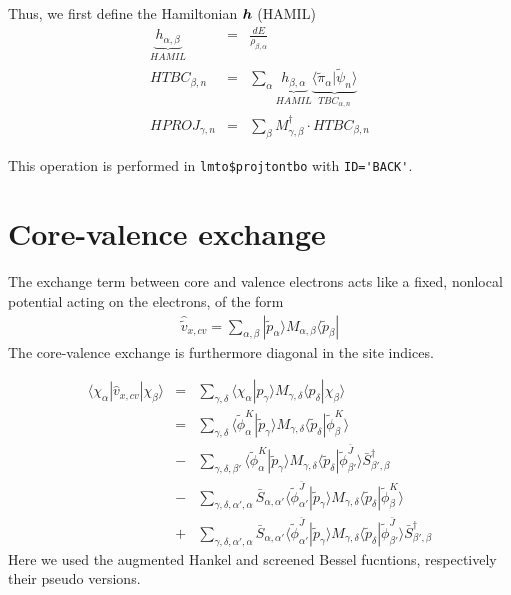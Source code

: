 \documentclass[11pt,a4paper]{report}
\begin{document}
Thus, we first define the Hamiltonian $\bm{h}$ (HAMIL) 
\begin{eqnarray}
\underbrace{h_{\alpha,\beta}}_{HAMIL}&=&\frac{dE}{\rho_{\beta,\alpha}}
\nonumber\\
HTBC_{\beta,n}&=&
\sum_\alpha \underbrace{h_{\beta,\alpha}}_{HAMIL}
\underbrace{\langle\tilde{\pi}_\alpha|\tilde{\psi}_n\rangle}_{TBC_{\alpha,n}}
\nonumber\\
HPROJ_{\gamma,n}&=&\sum_\beta M^\dagger_{\gamma,\beta}\cdot HTBC_{\beta,n}
\end{eqnarray}


This operation is performed in
\verb|lmto$projtontbo| with \verb|ID='BACK'|.




\section{Core-valence exchange}
The exchange term between core and valence electrons acts like a
fixed, nonlocal potential acting on the electrons, of the form
\begin{eqnarray}
\hat{\tilde{v}}_{x,cv}=\sum_{\alpha,\beta}|\tilde{p}_\alpha\rangle 
M_{\alpha,\beta}\langle\tilde{p}_\beta|
\end{eqnarray}
The core-valence exchange is furthermore diagonal in the site indices.

\begin{eqnarray}
\langle\chi_\alpha|\hat{v}_{x,cv}|\chi_\beta\rangle
&=&
\sum_{\gamma,\delta}
\langle\chi_\alpha|p_\gamma\rangle 
M_{\gamma,\delta}\langle p_\delta|\chi_\beta\rangle
\nonumber\\
&=&
\sum_{\gamma,\delta}
\langle\tilde{\phi}^{K}_\alpha|\tilde{p}_\gamma\rangle 
M_{\gamma,\delta}
\langle\tilde{p}_\delta|\tilde{\phi}^{K}_\beta\rangle
\nonumber\\
&-&
\sum_{\gamma,\delta,\beta'}
\langle\tilde{\phi}^{K}_\alpha|\tilde{p}_\gamma\rangle 
M_{\gamma,\delta}
\langle\tilde{p}_\delta|\tilde{\phi}^{\bar{J}}_{\beta'}\rangle 
\bar{S}^\dagger_{\beta',\beta}
\nonumber\\
&-&
\sum_{\gamma,\delta,\alpha',\alpha}
\bar{S}_{\alpha,\alpha'}
\langle\tilde{\phi}^{\bar{J}}_{\alpha'}|\tilde{p}_\gamma\rangle 
M_{\gamma,\delta}
\langle\tilde{p}_\delta|\tilde{\phi}^{K}_{\beta}\rangle 
\nonumber\\
&+&
\sum_{\gamma,\delta,\alpha',\alpha}
\bar{S}_{\alpha,\alpha'}
\langle\tilde{\phi}^{\bar{J}}_{\alpha'}|\tilde{p}_\gamma\rangle 
M_{\gamma,\delta}
\langle\tilde{p}_\delta|\tilde{\phi}^{\bar{J}}_{\beta'}\rangle 
\bar{S}^\dagger_{\beta',\beta}
\end{eqnarray}
Here we used the augmented Hankel and screened Bessel fucntions,
respectively their pseudo versions.
\end{document}
